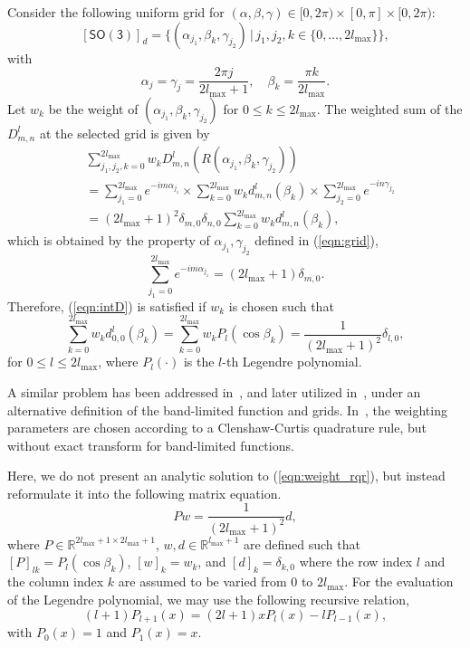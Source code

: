 \documentclass{ieeetran}
\newcommand{\refeqn}[1]{(\ref{eqn:#1})}
\newcommand{\SO}{\ensuremath{\mathsf{SO(3)}}}
\renewcommand{\Re}{\ensuremath{\mathbb{R}}}
\begin{document}
Consider the following uniform grid for $(\alpha,\beta,\gamma)\in[0,2\pi)\times[0,\pi]\times[0,2\pi)$:
\[
[\SO]_d=\{(\alpha_{j_1},\beta_k,\gamma_{j_2})\,|\, j_1,j_2,k\in\{0,\ldots, 2l_{\max}\}\},
\]
with
\begin{equation}\label{eqn:grid}
\alpha_j=\gamma_j= \frac{2\pi j}{2l_{\max}+1},\quad \beta_k = \frac{\pi k}{2l_{\max}}.
\end{equation}
Let $w_k$ be the weight of $(\alpha_{j_1},\beta_k,\gamma_{j_2})$ for $0\leq k\leq 2l_{\max}$. The weighted sum of the $D^l_{m,n}$ at the selected grid is given by
\begin{align*}
&\sum_{j_1,j_2,k=0}^{2l_{\max}} w_k D^l_{m,n}(R(\alpha_{j_1},\beta_k,\gamma_{j_2}))\\
& =  \sum_{j_1=0}^{2l_{\max}}e^{-im\alpha_{j_1}}\times  \sum_{k=0}^{2l_{\max}} w_k d^l_{m,n} (\beta_k) \times \sum_{j_2=0}^{2l_{\max}} e^{-in\gamma_{j_2}}\\
& = (2l_{\max}+1)^2\delta_{m,0}\delta_{n,0} \sum_{k=0}^{2l_{\max}} w_k d^l_{m,n} (\beta_k),
\end{align*}
which is obtained by the property of $\alpha_{j_1},\gamma_{j_2}$ defined in \refeqn{grid},
\[
\sum_{j_1=0}^{2l_{\max}}e^{-im\alpha_{j_1}} =(2l_{\max}+1)\delta_{m,0}.
\]
Therefore, \refeqn{intD} is satisfied if $w_k$ is chosen such that
\begin{equation}\label{eqn:weight_rqr}
\sum_{k=0}^{2l_{\max}} w_{k} d^l_{0,0} (\beta_k)
=\sum_{k=0}^{2l_{\max}} w_{k} P_l(\cos\beta_k)=\frac{1}{(2l_{\max}+1)^2}\delta_{l,0},
\end{equation}
for $0\leq l\leq 2l_{\max}$, where $P_l(\cdot)$ is the $l$-th Legendre polynomial. 

A similar problem has been addressed in~\cite{DriHeaAAM94}, and later utilized in~\cite{KosRocJFAA08}, under an alternative definition of the band-limited function and grids. In~\cite{PotPrePAUL07}, the weighting parameters are chosen according to a Clenshaw-Curtis quadrature rule, but without exact transform for band-limited functions. 

Here, we do not present an analytic solution to \refeqn{weight_rqr}, but instead reformulate it into the following matrix equation.
\[
P w = \frac{1}{(2l_{\max}+1)^2} d,
\]
where $P\in\Re^{2l_{\max}+1\times 2l_{\max}+1}$, $w,d\in\Re^{l_{\max}+1}$ are defined such that
$[P]_{lk}=P_l(\cos\beta_k)$, $[w]_k=w_k$, and $[d]_k=\delta_{k,0}$ where the row index $l$ and the column index $k$ are assumed to be varied from $0$ to $2l_{\max}$. For the evaluation of the Legendre polynomial, we may use the following recursive relation,
\[
(l+1)P_{l+1}(x)=(2l+1)xP_l(x)- lP_{l-1}(x),
\]
with $P_0(x)=1$ and $P_1(x)=x$. 
\end{document}
